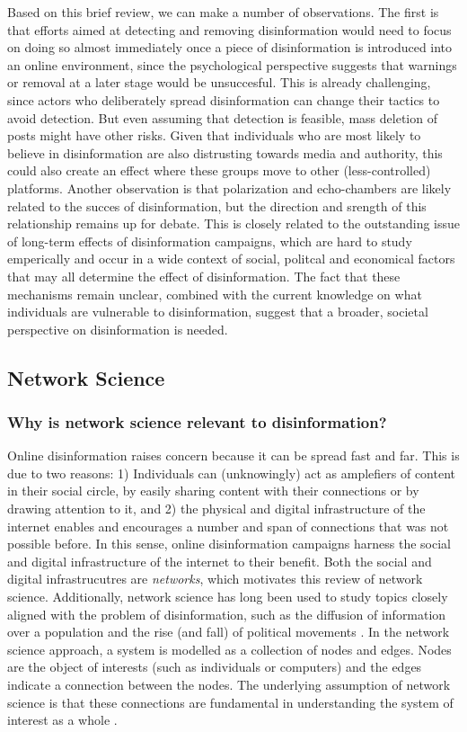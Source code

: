\documentclass[10pt,a4paper]{article}
\begin{document}
Based on this brief review, we can make a number of observations. The first is that efforts aimed at detecting and removing disinformation would need to focus on doing so almost immediately once a piece of disinformation is introduced into an online environment, since the psychological perspective suggests that warnings or removal at a later stage would be unsuccesful. This is already challenging, since actors who deliberately spread disinformation can change their tactics to avoid detection. But even assuming that detection is feasible, mass deletion of posts might have other risks. Given that individuals who are most likely to believe in disinformation are also distrusting towards media and authority, this could also create an effect where these groups move to other (less-controlled) platforms. 
Another observation is that polarization and echo-chambers are likely related to the succes of disinformation, but the direction and srength of this relationship remains up for debate. This is closely related to the outstanding issue of long-term effects of disinformation campaigns, which are hard to study emperically and occur in a wide context of social, politcal and economical factors that may all determine the effect of disinformation. The fact that these mechanisms remain unclear, combined with the current knowledge on what individuals are vulnerable to disinformation, suggest that a broader, societal perspective on disinformation is needed.


\subsection{Network Science}
\subsubsection{Why is network science relevant to disinformation?}
Online disinformation raises concern because it can be spread fast and far. This is due to two reasons: 1) Individuals can (unknowingly) act as amplefiers of content in their social circle, by easily sharing content with their connections or by drawing attention to it, and 2) the physical and digital infrastructure of the internet enables and encourages a number and span of connections that was not possible before. In this sense, online disinformation campaigns harness the social and digital infrastructure of the internet to their benefit. Both the social and digital infrastrucutres are \textit{networks}, which motivates this review of network science. Additionally, network science has long been used to study topics closely aligned with the problem of disinformation, such as the diffusion of information over a population and the rise (and fall) of political movements \citep{Guilbeault2018}. In the network science approach, a system is modelled as a collection of nodes and edges. Nodes are the object of interests (such as individuals or computers) and the edges indicate a connection between the nodes. The underlying assumption of network science is that these connections are fundamental in understanding the system of interest as a whole \citep{Brandes2013}.  \\
\end{document}
